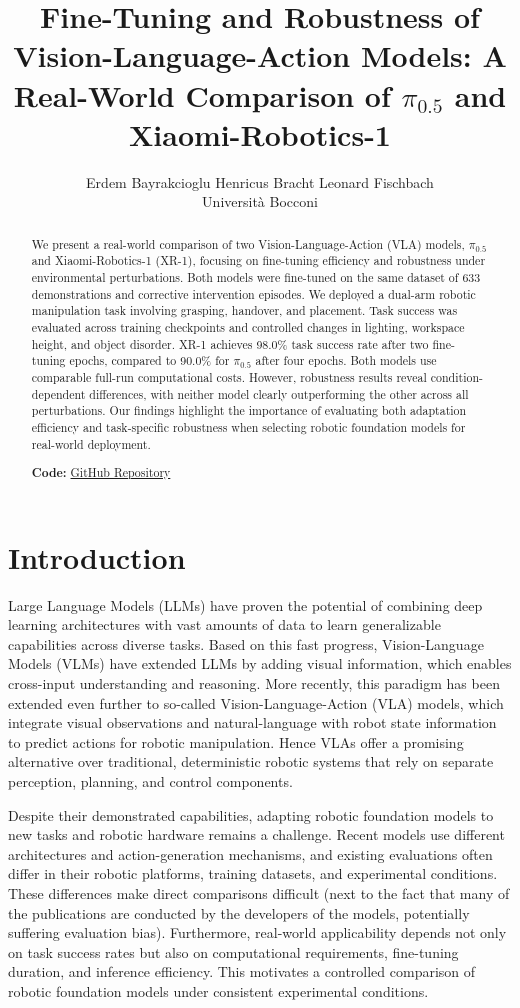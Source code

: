 \documentclass[10pt,twocolumn,letterpaper]{article}
\title{Fine-Tuning and Robustness of Vision-Language-Action Models:
A Real-World Comparison of $\pi_{0.5}$ and Xiaomi-Robotics-1}
\author{Erdem Bayrakcioglu \qquad Henricus Bracht \qquad Leonard Fischbach\\
Universit\`a Bocconi}
\begin{document}
\maketitle
\linenumbers

\begin{abstract}
We present a real-world comparison of two Vision-Language-Action (VLA) models, $\pi_{0.5}$ and Xiaomi-Robotics-1 (XR-1), focusing on fine-tuning efficiency and robustness under environmental perturbations. Both models were fine-tuned on the same dataset of 633 demonstrations and corrective intervention episodes. We deployed a dual-arm robotic manipulation task involving grasping, handover, and placement. Task success was evaluated across training checkpoints and controlled changes in lighting, workspace height, and object disorder. XR-1 achieves 98.0\% task success rate after two fine-tuning epochs, compared to 90.0\% for $\pi_{0.5}$ after four epochs. Both models use comparable full-run computational costs. However, robustness results reveal condition-dependent differences, with neither model clearly outperforming the other across all perturbations. Our findings highlight the importance of evaluating both adaptation efficiency and task-specific robustness when selecting robotic foundation models for real-world deployment.

\noindent\textbf{Code:} \href{https://github.com/LeoFischbach/Pi05_vs_XR1}{GitHub Repository}
\end{abstract}

\section{Introduction}
Large Language Models (LLMs) have proven the potential of combining deep learning architectures with vast amounts of data to learn generalizable capabilities across diverse tasks. Based on this fast progress, Vision-Language Models (VLMs) have extended LLMs by adding visual information, which enables cross-input understanding and reasoning. More recently, this paradigm has been extended even further to so-called Vision-Language-Action (VLA) models, which integrate visual observations and natural-language with robot state information to predict actions for robotic manipulation. Hence VLAs offer a promising alternative over traditional, deterministic robotic systems that rely on separate perception, planning, and control components.

Despite their demonstrated capabilities, adapting robotic foundation models to new tasks and robotic hardware remains a challenge. Recent models use different architectures and action-generation mechanisms, and existing evaluations often differ in their robotic platforms, training datasets, and experimental conditions. These differences make direct comparisons difficult (next to the fact that many of the publications are conducted by the developers of the models, potentially suffering evaluation bias). Furthermore, real-world applicability depends not only on task success rates but also on computational requirements, fine-tuning duration, and inference efficiency. This motivates a controlled comparison of robotic foundation models under consistent experimental conditions.
\end{document}
